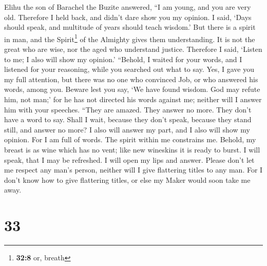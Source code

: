  Elihu the son of Barachel the Buzite answered, ``I am
young, and you are very old. Therefore I held back, and didn't dare show
you my opinion.  I said, `Days should speak, and multitude
of years should teach wisdom.'  But there is a spirit in
man, and the Spirit\footnote{\textbf{32:8} or, breath} of the Almighty
gives them understanding.  It is not the great who are
wise, nor the aged who understand justice.  Therefore I
said, `Listen to me; I also will show my opinion.' 
``Behold, I waited for your words, and I listened for your reasoning,
while you searched out what to say.  Yes, I gave you my
full attention, but there was no one who convinced Job, or who answered
his words, among you.  Beware lest you say, `We have
found wisdom. God may refute him, not man;'  for he has
not directed his words against me; neither will I answer him with your
speeches.  ``They are amazed. They answer no more. They
don't have a word to say.  Shall I wait, because they
don't speak, because they stand still, and answer no more?
 I also will answer my part, and I also will show my
opinion.  For I am full of words. The spirit within me
constrains me.  Behold, my breast is as wine which has no
vent; like new wineskins it is ready to burst.  I will
speak, that I may be refreshed. I will open my lips and answer.
 Please don't let me respect any man's person, neither
will I give flattering titles to any man.  For I don't
know how to give flattering titles, or else my Maker would soon take me
away.

\hypertarget{section-32}{%
\section{33}\label{section-32}}

